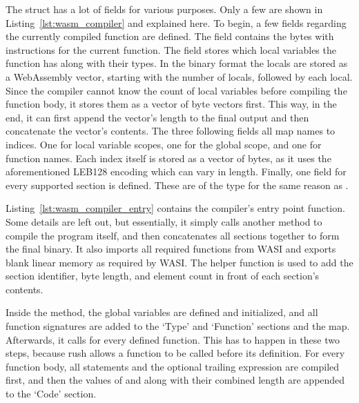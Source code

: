 The  struct has a lot of fields for various purposes.
Only a few are shown in Listing~\ref{lst:wasm_compiler} and explained here.
To begin, a few fields regarding the currently compiled function are defined.
The field  contains the bytes with instructions for the current function.
The field  stores which local variables the function has along with their types.
In the binary format the locals are stored as a WebAssembly vector, starting with the number of locals, followed by each local.
Since the compiler cannot know the count of local variables before compiling the function body, it stores them as a vector of byte vectors first.
This way, in the end, it can first append the vector's length to the final output and then concatenate the vector's contents.
The three following fields all map names to indices.
One for local variable scopes, one for the global scope, and one for function names.
Each index itself is stored as a vector of bytes, as it uses the aforementioned LEB128 encoding which can vary in length.
Finally, one field for every supported section is defined.
These are of the type  for the same reason as .


Listing~\ref{lst:wasm_compiler_entry} contains the compiler's entry point function.
Some details are left out, but essentially, it simply calls another method to compile the program itself, and then concatenates all sections together to form the final binary.
It also imports all required functions from WASI and exports blank linear memory as required by WASI.
The  helper function is used to add the section identifier, byte length, and element count in front of each section's contents.


Inside the  method, the global variables are defined and initialized, and all function signatures are added to the `Type' and `Function' sections and the  map.
Afterwards, it calls  for every defined function.
This has to happen in these two steps, because rush allows a function to be called before its definition.
For every function body, all statements and the optional trailing expression are compiled first, and then the values of  and  along with their combined length are appended to the `Code' section.

